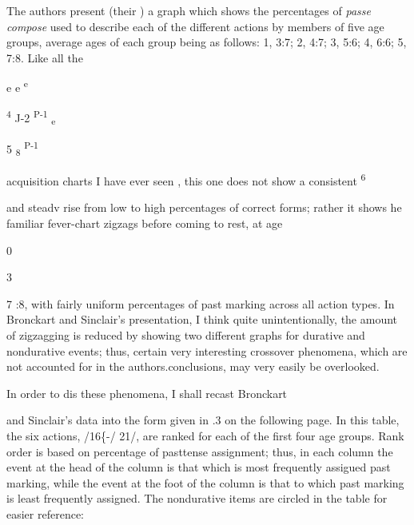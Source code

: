 

The authors present (their ) a graph which shows the percentages of \textit{passe} \textit{compose} used to describe each of the different actions by members of five age groups, average ages of each group being as follows: 1, 3:7; 2, 4:7; 3, 5:6; 4, 6:6; 5, 7:8. Like all the

e e \textsuperscript{e}

\textsuperscript{4 }J-2 \textsuperscript{P-1 }\textsubscript{e} 

5 \textsubscript{8 }\textsuperscript{P-1} 


acquisition charts I have ever seen , this one does not show a consistent\textsuperscript{ 6}

and steadv rise from low to high percentages of correct forms; rather it shows he familiar fever-chart zigzags before coming to rest, at age

0

\begin{table}
\caption{3}
\label{tab:3}
\end{table}

7 :8, with fairly uniform percentages of past marking across all action types. In Bronckart and Sinclair's presentation, I think quite unin\-tentionally, the amount of zigzagging is reduced by showing two different graphs for durative and nondurative events; thus, certain very interesting crossover phenomena, which are not accounted for in the authors.conclusions, may very easily be overlooked.

In order to dis these phenomena, I shall recast Bronckart

and Sinclair's data into the form given in .3 on the following page. In this table, the six actions, /16\{-/ 21/, are ranked for each of the first four age groups. Rank order is based on percentage of past\-tense assignment; thus, in each column the event at the head of the column is that which is most frequently assigued past marking, while the event at the foot of the column is that to which past marking is least frequently assigned. The nondurative items are circled in the
table for easier reference:


